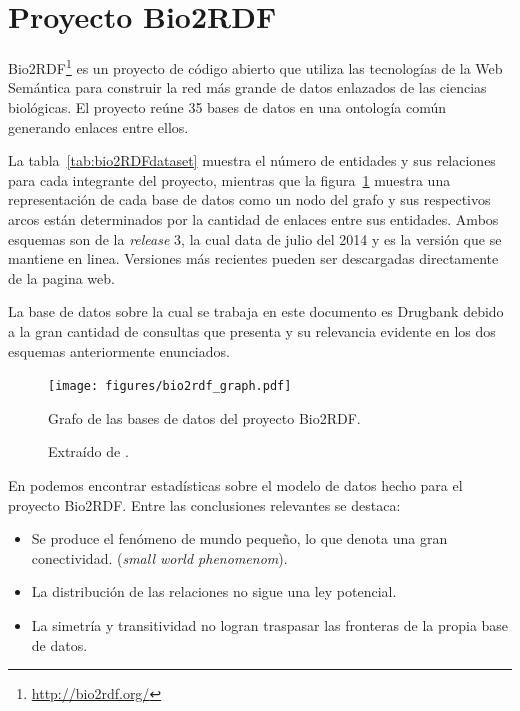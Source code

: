 \section{Proyecto Bio2RDF}\label{ea:bio}
Bio2RDF\hspace{0.5mm}\footnote{\url{http://bio2rdf.org/}}
\cite{belleau2008bio2rdf,callahan2013bio2rdf} es un proyecto de código
abierto que utiliza las tecnologías de la Web Semántica para construir la
red más grande de datos enlazados de las ciencias biológicas.
El proyecto reúne 35 bases de datos en una ontología común generando enlaces
entre ellos.

La tabla~\ref{tab:bio2RDFdataset} muestra el número de entidades y sus
relaciones para cada integrante del proyecto, mientras que la
figura~\ref{fig:bio2rdfgraph} muestra una representación de cada
base de datos como un nodo del grafo y sus respectivos arcos están determinados
por la cantidad de enlaces entre sus entidades.
Ambos esquemas son de la \emph{release} 3, la cual data de julio del 2014 y es
la versión que se mantiene en linea.
Versiones más recientes pueden ser descargadas directamente de la pagina web.

La base de datos sobre la cual se trabaja en este documento es Drugbank debido a
la gran cantidad de consultas que presenta y su relevancia evidente en los dos
esquemas anteriormente enunciados.



\begin{figure}[htpb]
  \centering
  \texttt{[image: figures/bio2rdf\_graph.pdf]}
  \caption{Grafo de las bases de datos del proyecto Bio2RDF.}
  \vspace{-.3cm}
  \caption*{Extraído de \cite{hu2015link}.}
  \label{fig:bio2rdfgraph}
\end{figure}

En \cite{hu2015link} podemos encontrar estadísticas sobre el modelo de datos
hecho para el proyecto Bio2RDF. Entre las conclusiones relevantes se destaca:
\begin{itemize}
  \item
    Se produce el fenómeno de mundo pequeño, lo que denota una gran
    conectividad. (\emph{small world phenomenom}).
  \item
    La distribución de las relaciones no sigue una ley potencial.
  \item
    La simetría y transitividad no logran traspasar las fronteras de la propia
    base de datos.
\end{itemize}


